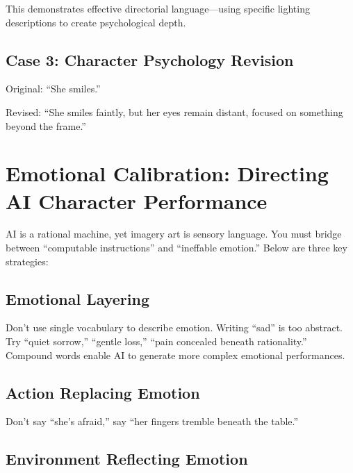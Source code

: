 This demonstrates effective directorial language—using specific lighting descriptions to create psychological depth.

\subsection{Case 3: Character Psychology Revision}

\begin{Prompt}
Original: ``She smiles.''

Revised: ``She smiles faintly, but her eyes remain distant, focused on something beyond the frame.''
\end{Prompt}

\section{Emotional Calibration: Directing AI Character Performance}
\label{sec:emotional-calibration}

AI is a rational machine, yet imagery art is sensory language. You must bridge between ``computable instructions'' and ``ineffable emotion.'' Below are three key strategies:

\subsection{Emotional Layering}

Don't use single vocabulary to describe emotion. Writing ``sad'' is too abstract. Try ``quiet sorrow,'' ``gentle loss,'' ``pain concealed beneath rationality.'' Compound words enable AI to generate more complex emotional performances.

\subsection{Action Replacing Emotion}

\begin{Prompt}
Don't say ``she's afraid,'' say ``her fingers tremble beneath the table.''
\end{Prompt}

\subsection{Environment Reflecting Emotion}


